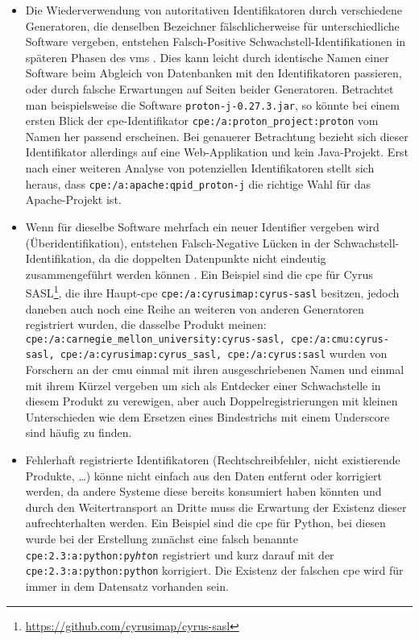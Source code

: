 \begin{itemize}
    \item Die Wiederverwendung von autoritativen Identifikatoren durch verschiedene Generatoren, die denselben Bezeichner fälschlicherweise für unterschiedliche Software vergeben, entstehen Falsch-Positive Schwachstell-Identifikationen in späteren Phasen des \acrshort{vms} \autocite{CISA2023}.
    Dies kann leicht durch identische Namen einer Software beim Abgleich von Datenbanken mit den Identifikatoren passieren, oder durch falsche Erwartungen auf Seiten beider Generatoren.
    Betrachtet man beispielsweise die Software \texttt{proton-j-0.27.3.jar}, so könnte bei einem ersten Blick der \acrshort{cpe}-Identifikator \texttt{cpe:/a:proton\_project:proton} vom Namen her passend erscheinen.
    Bei genauerer Betrachtung bezieht sich dieser Identifikator allerdings auf eine Web-Applikation und kein Java-Projekt.
    Erst nach einer weiteren Analyse von potenziellen Identifikatoren stellt sich heraus, dass \texttt{cpe:/a:apache:qpid\_proton-j} die richtige Wahl für das Apache-Projekt ist.

    \item Wenn für dieselbe Software mehrfach ein neuer Identifier vergeben wird (Überidentifikation), entstehen Falsch-Negative Lücken in der Schwachstell-Identifikation, da die doppelten Datenpunkte nicht eindeutig zusammengeführt werden können \autocite{CISA2023}.
    Ein Beispiel sind die \acrshort{cpe} für Cyrus SASL\footnote{\url{https://github.com/cyrusimap/cyrus-sasl}}, die ihre Haupt-\acrshort{cpe} \texttt{cpe:/a:cyrusimap:cyrus-sasl} besitzen, jedoch daneben auch noch eine Reihe an weiteren von anderen Generatoren registriert wurden, die dasselbe Produkt meinen:
    \texttt{cpe:/a:carnegie\_mellon\_university:cyrus-sasl, cpe:/a:cmu:cyrus-sasl, cpe:/a:cyrusimap:cyrus\_sasl, cpe:/a:cyrus:sasl} wurden von Forschern an der \acrfull{cmu} einmal mit ihren ausgeschriebenen Namen und einmal mit ihrem Kürzel vergeben um sich als Entdecker einer Schwachstelle in diesem Produkt zu verewigen, aber auch Doppelregistrierungen mit kleinen Unterschieden wie dem Ersetzen eines Bindestrichs mit einem Underscore sind häufig zu finden.

    \item Fehlerhaft registrierte Identifikatoren (Rechtschreibfehler, nicht existierende Produkte, \ldots) könne nicht einfach aus den Daten entfernt oder korrigiert werden, da andere Systeme diese bereits konsumiert haben könnten und durch den Weitertransport an Dritte muss die Erwartung der Existenz dieser aufrechterhalten werden.
    Ein Beispiel sind die \acrshort{cpe} für Python, bei diesen wurde bei der Erstellung zunächst eine falsch benannte \texttt{cpe:2.3:a:python:py\textit{ht}on} registriert und kurz darauf mit der \texttt{cpe:2.3:a:python:python} korrigiert.
    Die Existenz der falschen \acrshort{cpe} wird für immer in dem Datensatz vorhanden sein.


\end{itemize}

